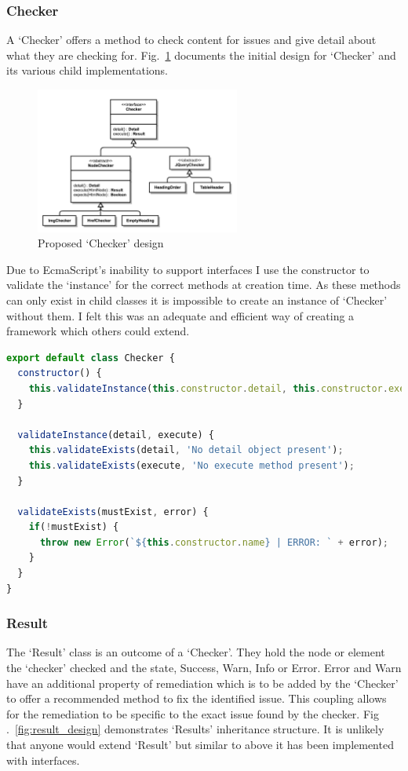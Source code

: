 \subsubsection{Checker}
A `Checker' offers a method to check content for issues and give detail
about what they are checking for. Fig.~\ref{fig:checker_design} documents the
initial design for `Checker' and its various child implementations.

\begin{figure}[H]
\centering
\includegraphics[width=0.6\textwidth]{figures/a11y_tool_checkers}
\captionsetup{justification=centering}
\caption{Proposed `Checker' design
\label{fig:checker_design}}
\end{figure}

Due to EcmaScript's inability to support interfaces I use the constructor to
validate the `instance' for the correct methods at creation time. As these
methods can only exist in child classes it is impossible to create an
instance of `Checker' without them. I felt this was an adequate and efficient
way of creating a framework which others could extend.

\begin{lstlisting}[language=JavaScript]
export default class Checker {
  constructor() {
    this.validateInstance(this.constructor.detail, this.constructor.execute);
  }

  validateInstance(detail, execute) {
    this.validateExists(detail, 'No detail object present');
    this.validateExists(execute, 'No execute method present');
  }

  validateExists(mustExist, error) {
    if(!mustExist) {
      throw new Error(`${this.constructor.name} | ERROR: ` + error);
    }
  }
}
\end{lstlisting}

\subsubsection{Result}
The `Result' class is an outcome of a `Checker'. They hold the node or element
the `checker' checked and the state, Success, Warn, Info or Error.
Error and Warn have an additional property of
remediation which is to be added by the `Checker' to offer a recommended
method to fix the identified issue. This coupling allows for the remediation
to be specific to the exact issue found by the checker. Fig
.~\ref{fig:result_design} demonstrates `Results' inheritance structure. It is
unlikely that anyone would extend `Result' but similar to above it has been
implemented with interfaces.


